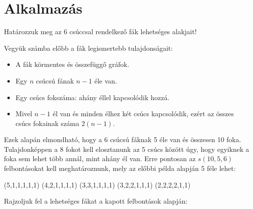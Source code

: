 \section*{Alkalmazás}
\begin{problem}
Határozzuk meg az 6 csúccsal rendelkező fák lehetséges alakjait! 
\end{problem}
\begin{solution}
Vegyük számba előbb a fák legismertebb tulajdonságait: 
\begin{itemize}
\item A fák körmentes és összefüggő gráfok. 
\item Egy $n$ csúcsú fának $n-1$ éle van. 
\item Egy csúcs fokszáma: ahány éllel kapcsolódik hozzá. 
\item Mivel $n-1$ él van és minden élhez két csúcs kapcsolódik, ezért az
összes csúcs fokainak száma $2(n-1)$. 
\end{itemize}
Ezek alapán elmondható, hogy a 6 csúcsú fáknak 5 éle van és összesen
10 foka. Tulajdonképpen a 8 fokot kell elosztanunk az 5 csúcs között
úgy, hogy egyiknek a foka sem lehet több annál, mint ahány él van.
Erre pontosan az $s(10,5,6)$ felbontásokat kell meghatároznunk, mely
az előbbi példa alapján 5 féle lehet:

\vspace{0.2cm}
 (5,1,1,1,1,1) \hspace{0.3cm} (4,2,1,1,1,1) \hspace{0.3cm} (3,3,1,1,1,1)
\hspace{0.3cm} (3,2,2,1,1,1) \hspace{0.3cm} (2,2,2,2,1,1)

\vspace{0.2cm}

Rajzoljuk fel a lehetséges fákat a kapott felbontások alapján:



\end{solution}
